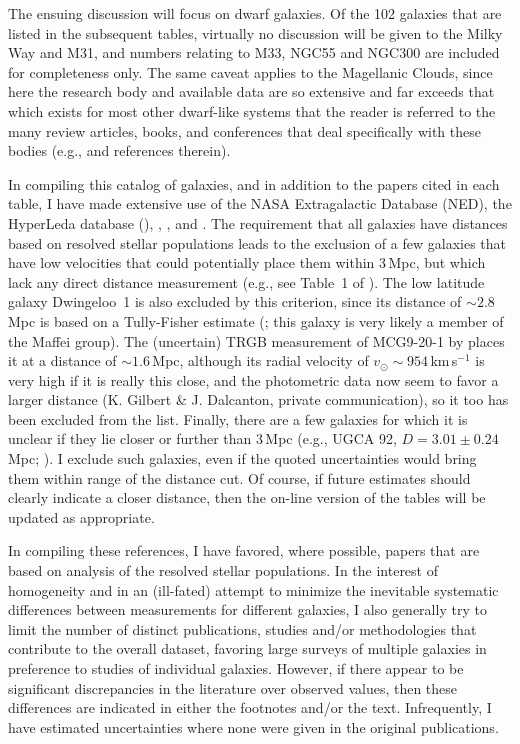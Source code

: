 \documentclass[manuscript]{aastex}
\begin{document}
The ensuing discussion will focus on dwarf galaxies. Of the 102
galaxies that are listed in the subsequent tables, virtually no
discussion will be given to the Milky Way and M31, and numbers
relating to M33, NGC55 and NGC300 are included for completeness
only. The same caveat applies to the Magellanic Clouds, since here
the research body and available data are so extensive and far exceeds that
which exists for most other dwarf-like systems that the reader is referred
to the many review articles, books, and conferences that deal
specifically with these bodies (e.g.,
\cite{westerlund1997,vanloon2009} and references therein).

In compiling this catalog of galaxies, and in addition to the papers
cited in each table, I have made extensive use of the NASA
Extragalactic Database (NED), the HyperLeda database
(\citealt{paturel2003}), \cite{mateo1998a}, \cite{vandenbergh2000},
and \cite{karachentsev2004}. The requirement that all galaxies have
distances based on resolved stellar populations leads to the exclusion
of a few galaxies that have low velocities that could potentially
place them within 3\,Mpc, but which lack any direct distance
measurement (e.g., see Table~1 of \citealt{karachentsev2004}). The low
latitude galaxy Dwingeloo~1 is also excluded by this criterion, since
its distance of $\sim 2.8$\,Mpc is based on a Tully-Fisher estimate
(\citealt{karachentsev2003b}; this galaxy is very likely a member of
the Maffei group). The (uncertain) TRGB measurement of MCG9-20-1 by
\cite{dalcanton2009} places it at a distance of $\sim 1.6\,$Mpc,
although its radial velocity of $v_\odot \sim 954$\,km\,s$^{-1}$ is
very high if it is really this close, and the photometric data now
seem to favor a larger distance (K. Gilbert \& J. Dalcanton, private
communication), so it too has been excluded from the list. Finally,
there are a few galaxies for which it is unclear if they lie closer or
further than 3\,Mpc (e.g., UGCA 92, $D = 3.01 \pm 0.24$\,Mpc;
\citealt{karachentsev2006}). I exclude such galaxies, even if the
quoted uncertainties would bring them within range of the distance
cut. Of course, if future estimates should clearly indicate a closer
distance, then the on-line version of the tables will be updated as
appropriate.

In compiling these references, I have favored, where possible, papers
that are based on analysis of the resolved stellar populations. In the
interest of homogeneity and in an (ill-fated) attempt to minimize the
inevitable systematic differences between measurements for different
galaxies, I also generally try to limit the number of distinct
publications, studies and/or methodologies that contribute to the
overall dataset, favoring large surveys of multiple galaxies in
preference to studies of individual galaxies. However, if there appear
to be significant discrepancies in the literature over observed values,
then these differences are indicated in either the footnotes and/or
the text. Infrequently, I have estimated uncertainties
where none were given in the original publications.
\end{document}
